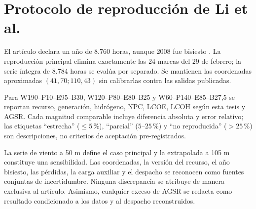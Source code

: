 \section{Protocolo de reproducción de Li et al.}

El artículo declara un año de 8.760 horas, aunque 2008 fue bisiesto \cite{Li2024WPEB}. La reproducción principal elimina exactamente las 24 marcas del 29 de febrero; la serie íntegra de 8.784 horas se evalúa por separado. Se mantienen las coordenadas aproximadas $(41{,}70;110{,}43)$ sin calibrarlas contra las salidas publicadas.

Para W190--P10--E95--B30, W120--P80--E80--B25 y W60--P140--E85--B27,5 se reportan recurso, generación, hidrógeno, NPC, LCOE, LCOH según esta tesis y AGSR. Cada magnitud comparable incluye diferencia absoluta y error relativo; las etiquetas ``estrecha'' ($\leq5$\,\%), ``parcial'' ($5$--$25$\,\%) y ``no reproducida'' ($>25$\,\%) son descripciones, no criterios de aceptación pre-registrados.

La serie de viento a 50 m define el caso principal y la extrapolada a 105 m constituye una sensibilidad. Las coordenadas, la versión del recurso, el año bisiesto, las pérdidas, la carga auxiliar y el despacho se reconocen como fuentes conjuntas de incertidumbre. Ninguna discrepancia se atribuye de manera exclusiva al artículo. Asimismo, cualquier exceso de AGSR se redacta como resultado condicionado a los datos y al despacho reconstruidos.
